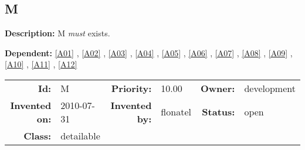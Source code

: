\subsection{M}\label{M}
\textbf{Description:} M \textsl{must} exists.

\textbf{Dependent:} \ref{A01} , \ref{A02} , \ref{A03} , \ref{A04} , \ref{A05} , \ref{A06} , \ref{A07} , \ref{A08} , \ref{A09} , \ref{A10} , \ref{A11} , \ref{A12} 

\par
{\small \begin{center}\begin{tabular}{rlrlrl}
\textbf{Id:} & M  & \textbf{Priority:} & 10.00  & \textbf{Owner:} & development\\ 
\textbf{Invented on:} & 2010-07-31  & \textbf{Invented by:} & flonatel  & \textbf{Status:} & open \\ 
\textbf{Class:} & detailable  & & & \end{tabular}\end{center} }

